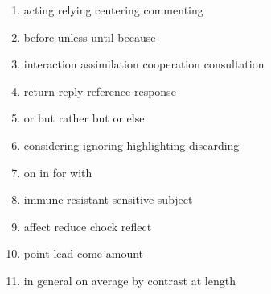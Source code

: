 \newpage
\begin{enumerate}
	\item


\fourchoices
{acting}
{relying}
{centering}
{commenting}




\item


\fourchoices
{before}
{unless}
{until}
{because}




\item

\fourchoices
{interaction}
{assimilation}
{cooperation}
{consultation}


\item


\fourchoices
{return}
{reply}
{reference}
{response}




\item
\fourchoices
{or}
{but rather}
{but}
{or else}



\item

\fourchoices
{considering}
{ignoring}
{highlighting}
{discarding}



\item


\fourchoices
{on}
{in}
{for}
{with}




\item


\fourchoices
{immune}
{resistant}
{sensitive}
{subject}




\item


\fourchoices
{affect}
{reduce}
{chock}
{reflect}




\item


\fourchoices
{point}
{lead}
{come}
{amount}




\item


\fourchoices
{in general}
{on average}
{by contrast}
{at length}






\end{enumerate}
